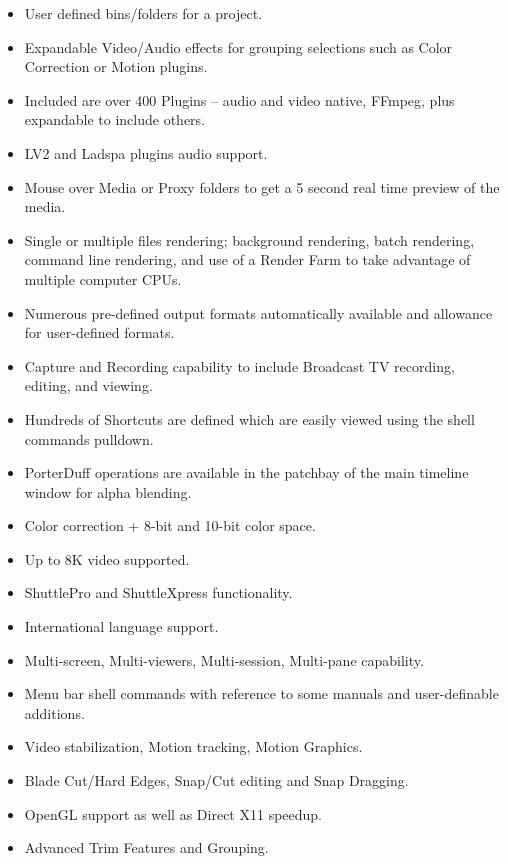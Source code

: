 \begin{description}
\begin{itemize}
                \item User defined bins/folders for a project.
                \item Expandable Video/Audio effects for grouping selections such as Color Correction or Motion plugins.
                \item Included are over 400 Plugins – audio and video native, FFmpeg, plus expandable to include others.
                \item LV2 and Ladspa plugins audio support.
                \item Mouse over Media or Proxy folders to get a 5 second real time preview of the media.
                \item Single or multiple files rendering; background rendering, batch rendering, command line rendering, and use of a Render Farm to take advantage of multiple computer CPUs.
                \item Numerous pre-defined output formats automatically available and allowance for user-defined formats.
                \item Capture and Recording capability to include Broadcast TV recording, editing, and viewing.
                \item Hundreds of Shortcuts are defined which are easily viewed using the shell commands pulldown.
                \item PorterDuff operations are available in the patchbay of the main timeline window for alpha blending.
                \item Color correction + 8-bit and 10-bit color space.
                \item Up to 8K video supported.
                \item ShuttlePro and ShuttleXpress functionality.
                \item International language support.
                \item Multi-screen, Multi-viewers, Multi-session, Multi-pane capability.
                \item Menu bar shell commands with reference to some manuals and user-definable additions.
                \item Video stabilization, Motion tracking, Motion Graphics.
                \item Blade Cut/Hard Edges, Snap/Cut editing and Snap Dragging.
                \item OpenGL support as well as Direct X11 speedup.
                \item Advanced Trim Features and Grouping.

\end{itemize}
\end{description}

